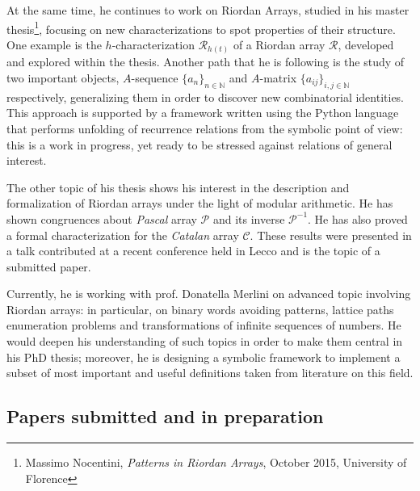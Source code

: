 \documentclass[a4paper]{tufte-handout}
\begin{document}
    At the same time, he continues to work on Riordan Arrays, studied in his
    master thesis\footnote{Massimo Nocentini, \textit{Patterns in Riordan Arrays}, October 2015, University of Florence}, 
    focusing on new characterizations to spot properties of their
    structure. One example is the $h$-characterization $\mathcal{R}_{h(t)}$ of a
    Riordan array $\mathcal{R}$, developed and explored within the thesis.
    Another path that he is following is the study of two important objects, $A$-sequence
    $\lbrace a_{n}\rbrace_{n\in\mathbb{N}}$ and $A$-matrix $\lbrace
    a_{ij}\rbrace_{i,j\in\mathbb{N}}$ respectively, generalizing them in order to
    discover new combinatorial identities. This approach is supported by a framework
    written using the Python language that performs unfolding of recurrence relations
    from the symbolic point of view: this is a work in progress, yet ready
    to be stressed against relations of general interest.


    The other topic of his thesis shows his interest in the description and formalization of Riordan
    arrays under the light of modular arithmetic. He has shown congruences
    about \emph{Pascal} array $\mathcal{P}$ and its inverse $\mathcal{P}^{-1}$. He
    has also proved a formal characterization for the \emph{Catalan} array
    $\mathcal{C}$. These results were presented in a talk contributed at a recent
    conference held in Lecco and is the topic of a submitted paper.

    Currently, he is working with prof. Donatella Merlini
    on advanced topic involving Riordan arrays: in particular, on binary words avoiding patterns, 
    lattice paths enumeration problems and transformations of infinite sequences of numbers.
    He would deepen his understanding of such topics in order to make them central in his PhD thesis;
    moreover, he is designing a symbolic framework to implement a subset of most important and useful
    definitions taken from literature on this field.

    \subsection{Papers submitted and in preparation}
\end{document}
